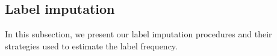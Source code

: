 \documentclass[conference,compsoc]{IEEEtran}
\begin{document}









\subsection{Label imputation}
In this subsection, we present our label imputation procedures and their strategies used to estimate the label frequency.
\end{document}
